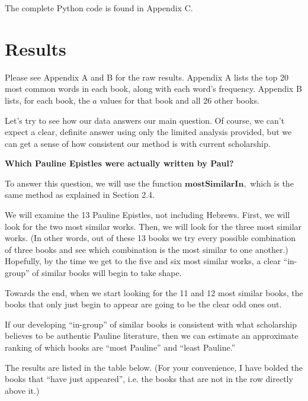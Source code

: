 \documentclass[12pt,letterpaper]{article}
\begin{document}
The complete Python code is found in Appendix C.  

\section{Results}
Please see Appendix A and B for the raw results.  Appendix A lists the top 20 most common words in each book, along with each word's frequency.  Appendix B lists, for each book, the $a$ values for that book and all 26 other books.  

Let's try to see how our data answers our main question.  Of course, we can't expect a clear, definite answer using only the limited analysis provided, but we can get a sense of how consistent our method is with current scholarship.  

\textbf{Which Pauline Epistles were actually written by Paul?}

To answer this question, we will use the function $\textbf{mostSimilarIn},$ which is the same method as explained in Section 2.4.  

We will examine the 13 Pauline Epistles, not including Hebrews.  First, we will look for the two most similar works.  Then, we will look for the three most similar works.  (In other words, out of these 13 books we try every possible combination of three books and see which combination is the most similar to one another.)  Hopefully, by the time we get to the five and six most similar works, a clear ``in-group'' of similar books will begin to take shape.  

Towards the end, when we start looking for the 11 and 12 most similar books, the books that only just begin to appear are going to be the clear odd ones out.

If our developing ``in-group'' of similar books is consistent with what scholarship believes to be authentic Pauline literature, then we can estimate an approximate ranking of which books are ``most Pauline'' and ``least Pauline.''

The results are listed in the table below.  (For your convenience, I have bolded the books that ``have just appeared'', i.e. the books that are not in the row directly above it.)
\end{document}
